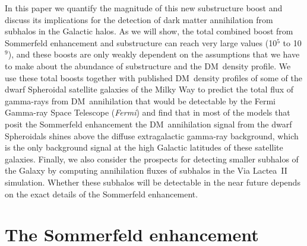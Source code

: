 \documentclass[aps,prd,twocolumn,amsmath,amssymb,floatfix,nofootinbib,10pt]{revtex4}
\newcommand{\Fermi}{\emph{Fermi}}
\newcommand{\VL}{Via Lactea}
\newcommand{\DM}{DM}
\begin{document}
In this paper we quantify the magnitude of this new substructure boost
and discuss its implications for the detection of dark matter
annihilation from subhalos in the Galactic halos. As we will show, the
total combined boost from Sommerfeld enhancement and substructure can
reach very large values (10$^5$ to 10$^9$), and these boosts are only
weakly dependent on the assumptions that we have to make about the
abundance of substructure and the \DM\ density profile. We use these
total boosts together with published \DM\ density profiles of some of
the dwarf Spheroidal satellite galaxies of the Milky Way to predict
the total flux of gamma-rays from \DM\ annihilation that would be
detectable by the Fermi Gamma-ray Space Telescope (\Fermi) and find
that in most of the models that posit the Sommerfeld enhancement the
\DM\ annihilation signal from the dwarf Spheroidals shines above the
diffuse extragalactic gamma-ray background, which is the only
background signal at the high Galactic latitudes of these satellite
galaxies. Finally, we also consider the prospects for detecting
smaller subhalos of the Galaxy by computing annihilation fluxes of
subhalos in the \VL\ II simulation. Whether these subhalos will be
detectable in the near future depends on the exact details of the
Sommerfeld enhancement.




\section{The Sommerfeld enhancement}
\end{document}
